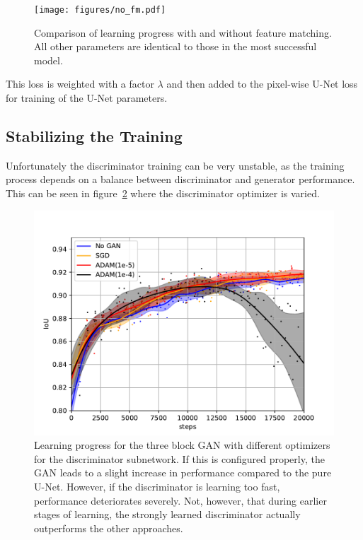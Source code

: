 \documentclass[aps,prl,twocolumn,groupedaddress,amsmath,amssymb]{revtex4-1}
\begin{document}
     \begin{figure}[tbp]
        \begin{center}
        \texttt{[image: figures/no\_fm.pdf]}
        \end{center}
        \caption{Comparison of learning progress with and without feature matching. All other 
        parameters are identical to those in the most successful model.}
        \label{fig:gan_fm}
    \end{figure}

    This loss is weighted with a factor $\lambda$ and then added to the pixel-wise U-Net loss for 
    training of the U-Net parameters.

    \subsection{Stabilizing the Training}

    Unfortunately the discriminator training can be very unstable, as the training process
    depends on a balance between discriminator and generator performance. This can be seen in 
    figure~\ref{fig:gan_3_opt} where the discriminator optimizer is varied.

    \begin{figure}[tbp]
        \begin{center}
        \includegraphics[width=\linewidth]{figures/gan_3_opt.pdf}
        \end{center}
        \caption{Learning progress for the three block GAN with different optimizers for the
        discriminator subnetwork. If this is configured properly, the GAN leads to a slight increase
        in performance compared to the pure U-Net. However, if the discriminator is learning too 
        fast, performance deteriorates severely. Not, however, that during earlier stages of learning,
        the strongly learned discriminator actually outperforms the other approaches.}
        \label{fig:gan_3_opt}
    \end{figure}
\end{document}

